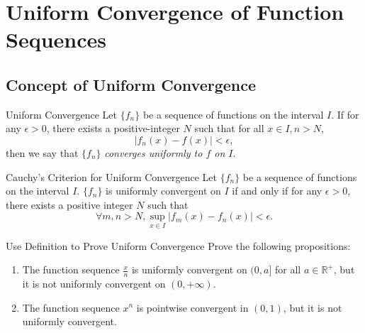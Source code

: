 
\section{Uniform Convergence of Function Sequences}

\subsection{Concept of Uniform Convergence}

\begin{definition}{Uniform Convergence}{}
  Let $\{f_n\}$ be a sequence of functions on the interval $I$.
  If for any $\epsilon > 0$, there exists a positive-integer $N$
  such that for all $x \in I, n > N$,
  \begin{equation}
    |f_n(x) - f(x)| < \epsilon,
  \end{equation}
  then we say that $\{f_n\}$ \emph{converges uniformly to $f$ on $I$}.
\end{definition}

\begin{theorem}{Cauchy's Criterion for Uniform Convergence}{}
  Let $\{f_n\}$ be a sequence of functions on the interval $I$.
  $\{f_n\}$ is uniformly convergent on $I$ if and only if
  for any $\epsilon > 0$, there exists a positive integer $N$ such that
  \begin{equation}
    \forall m,n > N, \sup \limits_{x \in I} |f_m(x) - f_n(x)| < \epsilon.
  \end{equation}
\end{theorem}

\begin{example}{Use Definition to Prove Uniform Convergence}{}
  Prove the following propositions:
  \begin{enumerate}
  \item The function sequence $\frac{x}{n}$ is uniformly convergent on $(0, a]$
    for all $a \in \mathbb{R}^+$, but it is not uniformly convergent on $(0, +\infty)$.
  \item The function sequence $x^n$ is pointwise convergent in $(0, 1)$,
    but it is not uniformly convergent.
  \end{enumerate}
\end{example}


